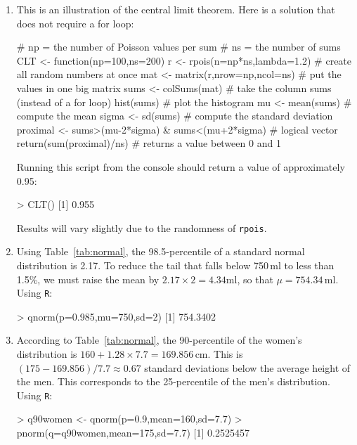 \begin{enumerate}

\item This is an illustration of the central limit theorem. Here is a
  solution that does not require a for loop:

\begin{script}
# np = the number of Poisson values per sum
# ns = the number of sums
CLT <- function(np=100,ns=200){
  r <- rpois(n=np*ns,lambda=1.2)   # create all random numbers at once
  mat <- matrix(r,nrow=np,ncol=ns) # put the values in one big matrix
  sums <- colSums(mat)  # take the column sums (instead of a for loop)
  hist(sums)            # plot the histogram
  mu <- mean(sums)      # compute the mean
  sigma <- sd(sums)     # compute the standard deviation
  proximal <- sums>(mu-2*sigma) & sums<(mu+2*sigma) # logical vector
  return(sum(proximal)/ns)         # returns a value between 0 and 1
}
\end{script}

Running this script from the console should return a value of
approximately 0.95:

\begin{console}
> CLT()
[1] 0.955
\end{console}

Results will vary slightly due to the randomness of \texttt{rpois}.

\item Using Table~\ref{tab:normal}, the 98.5-percentile of a standard
  normal distribution is 2.17. To reduce the tail that falls below
  750\,ml to less than 1.5\%, we must raise the mean by $2.17\times{2}
  = 4.34$ml, so that $\mu = 754.34$\,ml. Using \texttt{R}:

\begin{console}
> qnorm(p=0.985,mu=750,sd=2)
[1] 754.3402
\end{console}
  
\item According to Table~\ref{tab:normal}, the 90-percentile of the
  women's distribution is $160 + 1.28 \times 7.7 = 169.856$\,cm.  This
  is $(175-169.856)/7.7 \approx 0.67$ standard deviations below the
  average height of the men. This corresponds to the 25-percentile of
  the men's distribution. Using \texttt{R}:

\begin{console}
> q90women <- qnorm(p=0.9,mean=160,sd=7.7)
> pnorm(q=q90women,mean=175,sd=7.7)
[1] 0.2525457
\end{console}


\end{enumerate}
